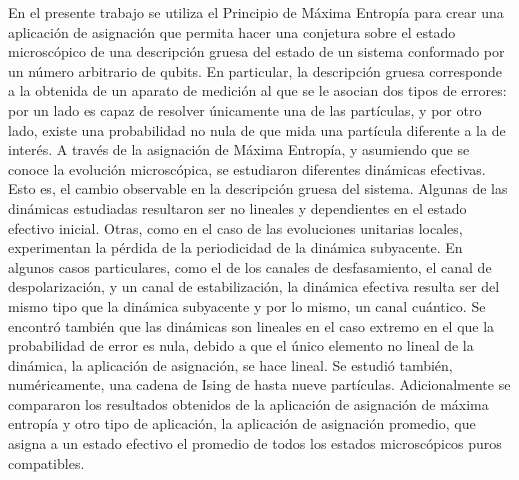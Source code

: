 \documentclass[12pt,twoside]{book}
\begin{document}
En el presente trabajo se utiliza el Principio de Máxima Entropía para crear una aplicación de asignación que permita hacer una conjetura sobre el estado microscópico de una descripción gruesa del estado de un sistema conformado por un número arbitrario de qubits. En particular, la descripción gruesa corresponde a la obtenida de un aparato de medición al que se le asocian dos tipos de errores: por un lado es capaz de resolver únicamente una de las partículas, y por otro lado, existe una probabilidad no nula de que mida una partícula diferente a la de interés. A través de la asignación de Máxima Entropía, y asumiendo que se conoce la evolución microscópica, se estudiaron diferentes dinámicas efectivas. Esto es, el cambio observable en la descripción gruesa del sistema. Algunas de las dinámicas estudiadas resultaron ser no lineales y dependientes en el estado efectivo inicial. Otras, como en el caso de las evoluciones unitarias locales, experimentan la pérdida de la periodicidad de la dinámica subyacente. En algunos casos particulares, como el de los canales de desfasamiento, el canal de despolarización, y un canal de estabilización, la dinámica efectiva resulta ser del mismo tipo que la dinámica subyacente y por lo mismo, un canal cuántico. Se encontró también que las dinámicas son lineales en el caso extremo en el que la probabilidad de error es nula, debido a que el único elemento no lineal de la dinámica, la aplicación de asignación, se hace lineal. Se estudió también, numéricamente, una cadena de Ising de hasta nueve partículas. Adicionalmente se compararon los resultados obtenidos de la aplicación de asignación de máxima entropía y otro tipo de aplicación, la aplicación de asignación promedio, que asigna a un estado efectivo el promedio de todos los estados microscópicos puros compatibles.
\pagestyle{plain}
\tableofcontents
\newpage





\appendix




\end{document}
